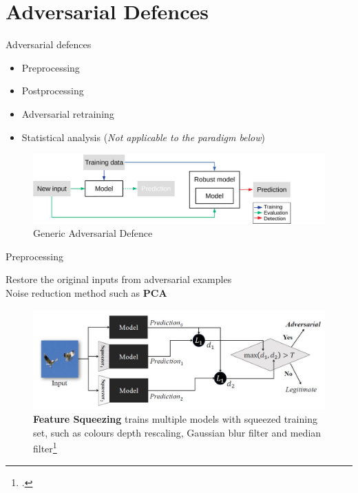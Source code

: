 \documentclass[9pt]{beamer}
\begin{document}
\section{Adversarial Defences}

\begin{frame}{Adversarial defences}

\begin{itemize}
    \item Preprocessing
    \item Postprocessing
    \item Adversarial retraining
    \item Statistical analysis (\textit{Not applicable to the paradigm below})
\end{itemize}

\begin{figure}
    \centering
    \small
    \includegraphics[width=\linewidth]{images/generic-defence.pdf}
    \caption{Generic Adversarial Defence}
    \label{fig:defence}
\end{figure}

\end{frame}

\begin{frame}{Preprocessing}
\label{preprocessing}

Restore the original inputs from adversarial examples\\
Noise reduction method such as \textbf{PCA}
\begin{examples}
    \begin{figure}
        \centering
        \small
        \includegraphics[width=0.8\linewidth]{images/feature_squeezing.jpg}
        \caption{\textbf{Feature Squeezing} trains multiple models with squeezed training set, such as colours depth rescaling, Gaussian blur filter and median filter\footcite{xu2017feature}}
    \end{figure}
\end{examples}

\hyperlink{adv_examples}{}
\end{frame}
\end{document}
